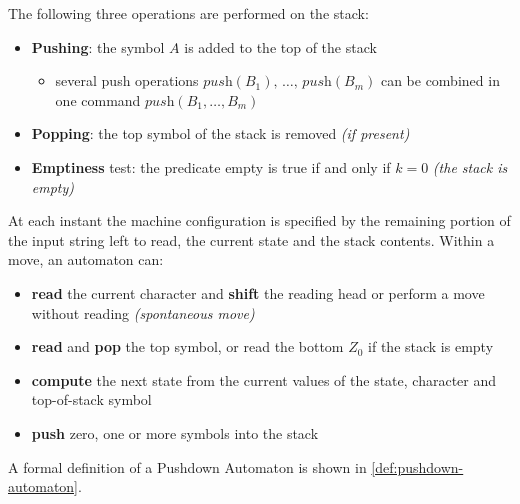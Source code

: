 \documentclass[english]{article}
\begin{document}
The following three operations are performed on the stack:

\begin{itemize}
  \item \textbf{Pushing}: the symbol \(A\) is added to the top of the stack
        \begin{itemize}[label=\(\rightarrow\)]
          \item several push operations \(\textit{push}(B_1), \, \ldots, \, \textit{push}(B_m)\) can be combined in one command \(\textit{push}(B_1, \ldots, B_m)\)
        \end{itemize}
  \item \textbf{Popping}: the top symbol of the stack is removed \textit{(if present)}
  \item \textbf{Emptiness} test: the predicate empty is true if and only if \(k=0\) \textit{(the stack is empty)}
\end{itemize}

At each instant the machine configuration is specified by the remaining portion of the input string left to read, the current state and the stack contents.
Within a move, an automaton can:

\begin{itemize}
  \item \textbf{read} the current character and \textbf{shift} the reading head or perform a move without reading \textit{(spontaneous move)}
  \item \textbf{read} and \textbf{pop} the top symbol, or read the bottom \(Z_0\) if the stack is empty
  \item \textbf{compute} the next state from the current values of the state, character and top-of-stack symbol
  \item \textbf{push} zero, one or more symbols into the stack
\end{itemize}

A formal definition of a Pushdown Automaton is shown in \ref{def:pushdown-automaton}.
\end{document}
